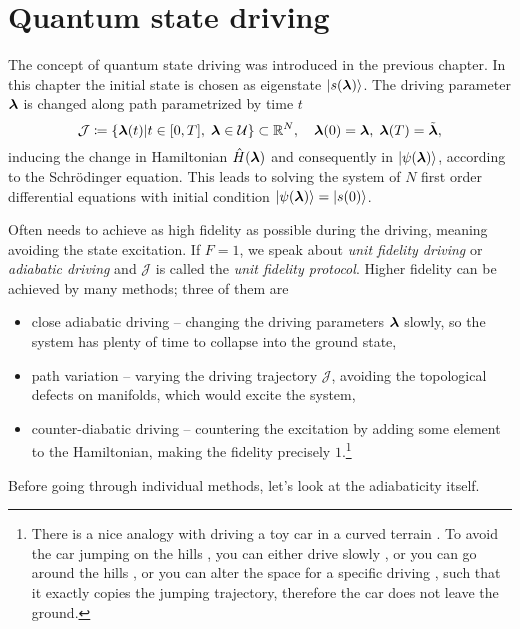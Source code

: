 \chapter{Quantum state driving}
\label{chap:typesOfDriving}
The concept of quantum state driving was introduced in the previous chapter. In this chapter the initial state is chosen as eigenstate $\ket{s({\bm\lambda})}$. The driving parameter ${\bm\lambda}$ is changed along path parametrized by time $t$
\begin{equation}
    \mathcal J\coloneqq\{{\bm\lambda}(t)|t\in[0,T],\; {\bm\lambda}\in \mathcal U\} \subset \mathbb{R}^N,\quad {\bm\lambda}(0)={\bm\lambda},\; {\bm\lambda}(T)=\tilde{{\bm\lambda}},
    \label{eq:defJ_QSdriving}
\end{equation}
inducing the change in Hamiltonian $\hat{H}({\bm\lambda})$ and consequently in $\ket{\psi({\bm\lambda})}$, according to the Schr\"odinger equation. This leads to solving the system of $N$ first order differential equations with initial condition $\ket{\psi({\bm\lambda})}=\ket{s(0)}$.

Often needs to achieve as high fidelity as possible during the driving, meaning avoiding the state excitation. If $F=1$, we speak about \emph{unit fidelity driving} or \emph{adiabatic driving} and $\mathcal J$ is called the \emph{unit fidelity protocol}. Higher fidelity can be achieved by many methods; three of them are
\begin{itemize}
    \item close adiabatic driving -- changing the driving parameters ${\bm\lambda}$ slowly, so the system has plenty of time to collapse into the ground state,
    \item path variation -- varying the driving trajectory $\mathcal J$, avoiding the topological defects on manifolds, which would excite the system,
    \item counter-diabatic driving -- countering the excitation by adding some element to the Hamiltonian, making the fidelity precisely $1$.\footnote{There is a nice analogy with driving a toy car  in a curved terrain . To avoid the car jumping on the hills , you can either drive slowly , or you can go around the hills , or you can alter the space for a specific driving , such that it exactly copies the jumping trajectory, therefore the car does not leave the ground.}
\end{itemize}

Before going through individual methods, let's look at the adiabaticity itself.

